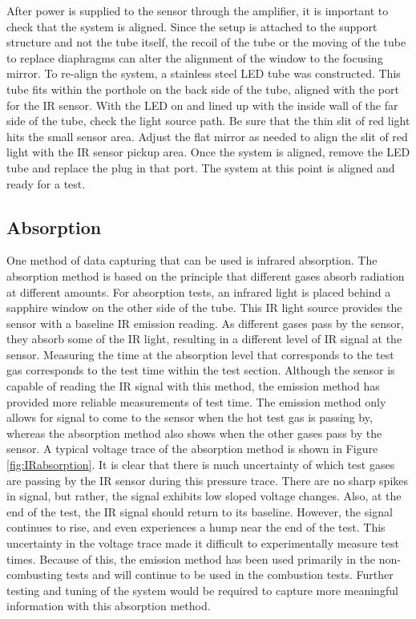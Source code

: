 After power is supplied to the sensor through the amplifier, it is important to check that the system is aligned. Since the setup is attached to the support structure and not the tube itself, the recoil of the tube or the moving of the tube to replace diaphragms can alter the alignment of the window to the focusing mirror. To re-align the system, a stainless steel LED tube was constructed. This tube fits within the porthole on the back side of the tube, aligned with the port for the IR sensor. With the LED on and lined up with the inside wall of the far side of the tube, check the light source path. Be sure that the thin slit of red light hits the small sensor area. Adjust the flat mirror as needed to align the slit of red light with the IR sensor pickup area. Once the system is aligned, remove the LED tube and replace the plug in that port. The system at this point is aligned and ready for a test.  


\subsection{Absorption}

One method of data capturing that can be used is infrared absorption. The absorption method is based on the principle that different gases absorb radiation at different amounts. For absorption tests, an infrared light is placed behind a sapphire window on the other side of the tube. This IR light source provides the sensor with a baseline IR emission reading. As different gases pass by the sensor, they absorb some of the IR light, resulting in a different level of IR signal at the sensor. Measuring the time at the absorption level that corresponds to the test gas corresponds to the test time within the test section. Although the sensor is capable of reading the IR signal with this method, the emission method has provided more reliable measurements of test time. The emission method only allows for signal to come to the sensor when the hot test gas is passing by, whereas the absorption method also shows when the other gases pass by the sensor. A typical voltage trace of the absorption method is shown in Figure \ref{fig:IRabsorption}. It is clear that there is much uncertainty of which test gases are passing by the IR sensor during this pressure trace. There are no sharp spikes in signal, but rather, the signal exhibits low sloped voltage changes. Also, at the end of the test, the IR signal should return to its baseline. However, the signal continues to rise, and even experiences a hump near the end of the test. This uncertainty in the voltage trace made it difficult to experimentally measure test times. Because of this, the emission method has been used primarily in the non-combusting tests and will continue to be used in the combustion tests. Further testing and tuning of the system would be required to capture more meaningful information with this absorption method. 


